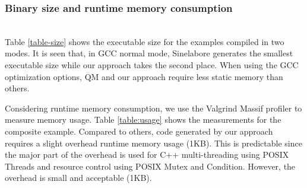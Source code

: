 \subsubsection{Binary size and runtime memory consumption} ~\\
\noindent
{} Table \ref{table-size} shows the executable size for the examples compiled in two modes.
It is seen that, in GCC normal mode, Sinelabore generates the smallest executable size while our approach takes the second place.
When using the GCC optimization options, QM and our approach require less static memory than others. 

Considering runtime memory consumption, we use the Valgrind Massif profiler\cite{Massif} to measure memory usage. 
Table \ref{table:usage} shows the measurements for the composite example. 
Compared to others, code generated by our approach requires a slight overhead runtime memory usage (1KB).
This is predictable since the major part of the overhead is used for C++ multi-threading using POSIX Threads and resource control using POSIX Mutex and Condition. 
However, the overhead is small and acceptable (1KB). 

